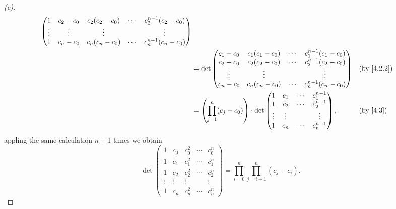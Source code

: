 \begin{proof}[(c)]
\begin{align*}
\begin{pmatrix}
               1      & c_2 - c_0 & c_2 (c_2 - c_0) & \cdots & c_2^{n - 1} (c_2 - c_0) \\
               \vdots & \vdots    & \vdots          &        & \vdots                  \\
               1      & c_n - c_0 & c_n (c_n - c_0) & \cdots & c_n^{n - 1} (c_n - c_0)
             \end{pmatrix}                         \\
     & = \det\begin{pmatrix}
               c_1 - c_0 & c_1 (c_1 - c_0) & \cdots & c_1^{n - 1} (c_1 - c_0) \\
               c_2 - c_0 & c_2 (c_2 - c_0) & \cdots & c_2^{n - 1} (c_2 - c_0) \\
               \vdots    & \vdots          &        & \vdots                  \\
               c_n - c_0 & c_n (c_n - c_0) & \cdots & c_n^{n - 1} (c_n - c_0)
             \end{pmatrix}          &  & \text{(by \cref{4.2.2})}                                  \\
     & = \pa{\prod_{j = 1}^n (c_j - c_0)} \cdot \det\begin{pmatrix}
                                                      1      & c_1    & \cdots & c_1^{n - 1} \\
                                                      1      & c_2    & \cdots & c_2^{n - 1} \\
                                                      \vdots & \vdots &        & \vdots      \\
                                                      1      & c_n    & \cdots & c_n^{n - 1}
                                                    \end{pmatrix},               &  & \text{(by \cref{4.3})}
  \end{align*}
  appling the same calculation \(n + 1\) times we obtain
  \[
    \det\begin{pmatrix}
      1      & c_0    & c_0^2  & \cdots & c_0^n  \\
      1      & c_1    & c_1^2  & \cdots & c_1^n  \\
      1      & c_2    & c_2^2  & \cdots & c_2^n  \\
      \vdots & \vdots & \vdots &        & \vdots \\
      1      & c_n    & c_n^2  & \cdots & c_n^n
    \end{pmatrix} = \prod_{i = 0}^n \prod_{j = i + 1}^n (c_j - c_i).
  \]
\end{proof}
